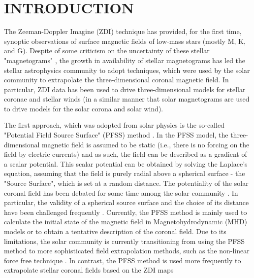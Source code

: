 \documentclass[apj]{emulateapj}
\begin{document}


\section{INTRODUCTION}
\label{sec:Intro}

The Zeeman-Doppler Imagine (ZDI) technique \citep{DonatiSemel90} has provided, for the first time, synoptic observations of surface magnetic fields of low-mass stars (mostly M, K, and G). Despite of some criticism on the uncertainty of these stellar "magnetograms" \citep[e.g.,][]{Kochukhov10,Reiners12}, the growth in availability of stellar magnetograms \citep[see][for a summary of these observations]{Vidotto14b} has led the stellar astrophysics community to adopt techniques, which were used by the solar community to extrapolate the three-dimensional coronal magnetic field. In particular, ZDI data has been used to drive three-dimensional models for stellar coronae and stellar winds (in a similar manner that solar magnetograms are used to drive models for the solar corona and solar wind). 

The first approach, which was adopted from solar physics is the so-called "Potential Field Source Surface" (PFSS) method \citep{altschulernewkirk69}. In the PFSS model, the three-dimensional magnetic field is assumed to be static (i.e., there is no forcing on the field by electric currents) and as such, the field can be described as a gradient of a scalar potential. This scalar potential can be obtained by solving the Laplace's equation, assuming that the field is purely radial above a spherical surface - the "Source Surface", which is set at a random distance. The potentiality of the solar coronal field has been debated for some time among the solar community \citep[see e.g.,][]{Riley06}. In particular, the validity of a spherical source surface and the choice of its distance have been challenged frequently \citep[see][for recent review on the PFSS issues]{Cohen15}. Currently, the PFSS method is mainly used to calculate the initial state of the magnetic field in Magnetohydrodynamic (MHD) models or to obtain a tentative description of the coronal field. Due to its limitations, the solar community is currently transitioning from using the PFSS method to more sophisticated field extrapolation methods, such as the non-linear force free technique \citep[see review by][]{Wiegelmann12}. In contrast, the PFSS method is used more frequently to extrapolate stellar coronal fields based on the ZDI maps \citep[see e.g.,][]{Jardine99}
\end{document}
